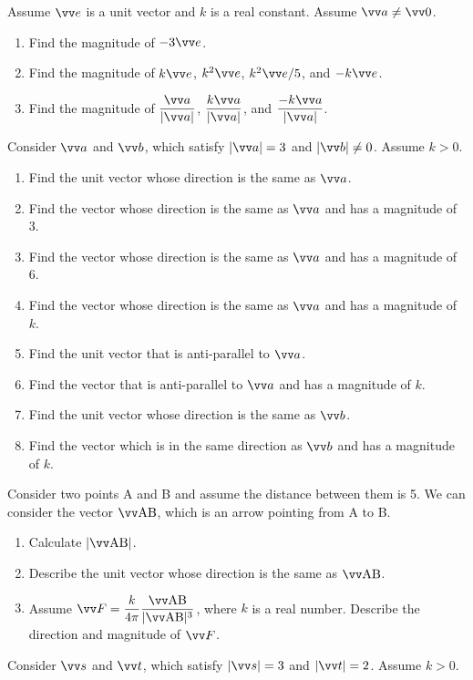 \documentclass[11pt,pdfa,lastpage]{MishoNote}
\begin{document}
\begin{problems}
 \Problem[S] Assume $\vc e$ is a unit vector and $k$ is a real constant. Assume $\vc a\neq \vc 0$.
 \begin{enumerate}
   \item Find the magnitude of $-3\vc e$.
   \item Find the magnitude of $k\vc e$, $k^2\vc e$, $k^2\vc e/5$, and $-k\vc e$.
   \item Find the magnitude of $\dfrac{\vc a}{|\vc a|}$, $\dfrac{k\vc a}{|\vc a|}$, and $\dfrac{-k\vc a}{|\vc a|}$. \quad{}
 \end{enumerate}
 \Problem[S] Consider $\vc a$ and $\vc b$, which satisfy $|\vc a|=3$ and $|\vc b|\neq 0$. Assume $k>0$.
 \begin{enumerate}
  \item Find the unit vector whose direction is the same as $\vc a$.
   \item Find the vector whose direction is the same as $\vc a$ and has a magnitude of 3.
   \item Find the vector whose direction is the same as $\vc a$ and has a magnitude of 6.
   \item Find the vector whose direction is the same as $\vc a$ and has a magnitude of $k$.
   \item Find the unit vector that is anti-parallel to $\vc a$.
   \item Find the vector that is anti-parallel to $\vc a$ and has a magnitude of $k$.
   \item Find the unit vector whose direction is the same as $\vc b$.
   \item Find the vector which is in the same direction as $\vc b$ and has a magnitude of $k$.
 \end{enumerate}
 \Problem[S] Consider two points A and B and assume the distance between them is 5. We can consider the vector $\vvv{AB}$, which is an arrow pointing from A to B.
  \begin{enumerate}
    \item Calculate $|\vvv{AB}|$.
    \item Describe the unit vector whose direction is the same as $\vvv{AB}$.
    \item Assume $\vc F=\displaystyle\frac{k}{4\pi}\frac{\vvv{AB}}{|\vvv{AB}|^3}$, where $k$ is a real number. Describe the direction and magnitude of $\vc F$.
  \end{enumerate}
 \Problem[A] Consider $\vc s$ and $\vc t$, which satisfy $|\vc s|=3$ and $|\vc t|=2$. Assume $k>0$.

\end{problems}
\end{document}
